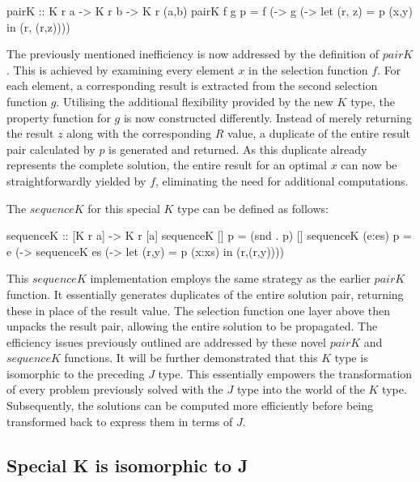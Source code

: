 \documentclass[runningheads]{llncs}
\begin{document}
\begin{code}
pairK :: K r a -> K r b -> K r (a,b)
pairK f g p = f (\x -> 
              g (\y -> let (r, z) = p (x,y) 
                       in (r, (r,z))))
\end{code}

The previously mentioned inefficiency is now addressed by the definition
of \(pairK\). This is achieved by examining every element \(x\) in the
selection function \(f\). For each element, a corresponding result is
extracted from the second selection function \(g\). Utilising the
additional flexibility provided by the new \(K\) type, the property
function for \(g\) is now constructed differently. Instead of merely
returning the result \(z\) along with the corresponding \(R\) value, a
duplicate of the entire result pair calculated by \(p\) is generated and
returned. As this duplicate already represents the complete solution,
the entire result for an optimal \(x\) can now be straightforwardly
yielded by \(f\), eliminating the need for additional computations.

The \(sequenceK\) for this special \(K\) type can be defined as follows:

\begin{code}
sequenceK :: [K r a] -> K r [a]
sequenceK [] p     = (snd . p) []
sequenceK (e:es) p = e (\x -> sequenceK es 
                       (\xs -> let (r,y) = p (x:xs) 
                               in (r,(r,y))))
\end{code}

This \(sequenceK\) implementation employs the same strategy as the
earlier \(pairK\) function. It essentially generates duplicates of the
entire solution pair, returning these in place of the result value. The
selection function one layer above then unpacks the result pair,
allowing the entire solution to be propagated. The efficiency issues
previously outlined are addressed by these novel \(pairK\) and
\(sequenceK\) functions. It will be further demonstrated that this \(K\)
type is isomorphic to the preceding \(J\) type. This essentially
empowers the transformation of every problem previously solved with the
\(J\) type into the world of the \(K\) type. Subsequently, the solutions
can be computed more efficiently before being transformed back to
express them in terms of \(J\).

\subsection{Special K is isomorphic to
J}\label{special-k-is-isomorphic-to-j}
\end{document}
